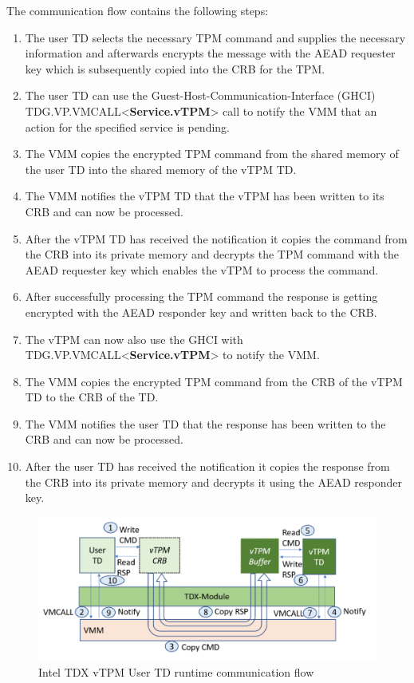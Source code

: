 \documentclass[sigplan,screen,nonacm]{acmart}
\begin{document}
The communication flow contains the following steps:
\begin{enumerate}
    \item The user TD selects the necessary TPM command and supplies the necessary information and afterwards encrypts the message with the AEAD requester key which is subsequently copied into the CRB for the TPM.
    \item The user TD can use the Guest-Host-Communication-Interface (GHCI) TDG.VP.VMCALL<\textbf{Service.vTPM}> call to notify the VMM that an action for the specified service is pending.
    \item The VMM copies the encrypted TPM command from the shared memory of the user TD into the shared memory of the vTPM TD.
    \item The VMM notifies the vTPM TD that the vTPM has been written to its CRB and can now be processed.
    \item After the vTPM TD has received the notification it copies the command from the CRB into its private memory and decrypts the TPM command with the AEAD requester key which enables the vTPM to process the command.
    \item After successfully processing the TPM command the response is getting encrypted with the AEAD responder key and written back to the CRB.
    \item The vTPM can now also use the GHCI with \\TDG.VP.VMCALL<\textbf{Service.vTPM}> to notify the VMM.
    \item The VMM copies the encrypted TPM command from the CRB of the vTPM TD to the CRB of the TD.
    \item The VMM notifies the user TD that the response has been written to the CRB and can now be processed.
    \item After the user TD has received the notification it copies the response from the CRB into its private memory and decrypts it using the AEAD responder key. 
\end{enumerate}

\begin{figure}
  \centering
  \includegraphics[width=\linewidth]{pictures/vTPM_communication.png}
  \caption{Intel TDX vTPM User TD runtime communication flow \cite{Intel-vTPM}}
  \label{fig:vtpmcommunication}
\end{figure}
\end{document}
